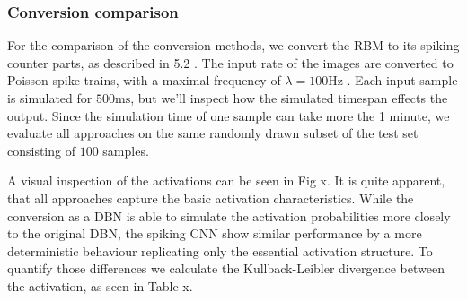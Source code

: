 \subsubsection{Conversion comparison}

For the comparison of the conversion methods, we convert the RBM to its spiking counter parts, as described in 5.2 . 
The input rate of the images are converted to Poisson spike-trains, with a maximal frequency of $\lambda = 100 \text{Hz}$ .
Each input sample is simulated for $500 \text{ms}$, but we'll inspect how the simulated timespan effects the output.
Since the simulation time of one sample can take more the 1 minute, we evaluate all approaches on the same randomly drawn subset of the test set consisting of $100$ samples.

A visual inspection of the activations can be seen in Fig x. 
It is quite apparent, that all approaches capture the basic activation characteristics. 
While the conversion as a DBN is able to simulate the activation probabilities more closely to the original DBN, the spiking CNN show similar performance by a more deterministic behaviour replicating only the essential activation structure.
To quantify those differences we calculate the Kullback-Leibler divergence between the activation, as seen in Table x.




